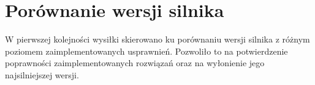 \section {Porównanie wersji silnika}
\label {sec: porownanie-wersji-silnika}

W pierwszej kolejności wysiłki skierowano ku porównaniu wersji silnika z różnym poziomem zaimplementowanych usprawnień.
Pozwoliło to na potwierdzenie poprawności zaimplementowanych rozwiązań oraz na wyłonienie jego najsilniejszej wersji.


%